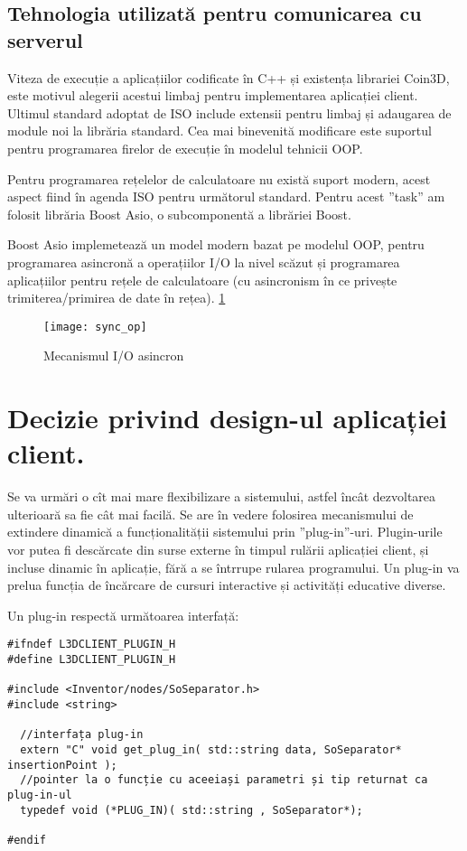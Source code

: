 \subsection{Tehnologia utilizată pentru comunicarea cu serverul}

\par Viteza de execuție a aplicațiilor codificate în C++ și existența librariei Coin3D, este motivul alegerii acestui limbaj pentru implementarea aplicației client. Ultimul standard adoptat de ISO include extensii pentru limbaj și adaugarea de module noi la librăria standard. Cea mai binevenită modificare este suportul pentru programarea firelor de execuție în modelul tehnicii OOP. 
\par Pentru programarea rețelelor de calculatoare nu există suport modern, acest aspect fiind în agenda ISO pentru următorul standard. Pentru acest ”task” am folosit librăria Boost Asio, o subcomponentă a librăriei Boost. 
\par Boost Asio implemetează un model modern bazat pe modelul OOP, pentru programarea asincronă a operațiilor I/O la nivel scăzut și programarea aplicațiilor pentru rețele de calculatoare (cu asincronism în ce privește trimiterea/primirea de date în rețea). \ref{fig:asio}

\begin{figure}[h]
    \centering
    \texttt{[image: sync\_op]}
    \caption{Mecanismul I/O asincron}
    \label{fig:asio}
\end{figure}

\section{Decizie privind design-ul aplicației client.}
\par Se va urmări o cît mai mare flexibilizare a sistemului, astfel încât dezvoltarea ulterioară sa fie cât mai facilă. Se are în vedere folosirea mecanismului de extindere dinamică a funcționalității sistemului prin ”plug-in”-uri. 	Plugin-urile vor putea fi descărcate din surse externe în timpul rulării aplicației client, și incluse dinamic în aplicație, fără a se întrrupe rularea programului. Un plug-in va prelua funcția de încărcare de cursuri interactive și activități educative diverse. 

	 Un plug-in respectă următoarea interfață:
\begin{verbatim}
#ifndef L3DCLIENT_PLUGIN_H
#define L3DCLIENT_PLUGIN_H

#include <Inventor/nodes/SoSeparator.h>
#include <string>
 
  //interfața plug-in
  extern "C" void get_plug_in( std::string data, SoSeparator* insertionPoint );
  //pointer la o funcție cu aceeiași parametri și tip returnat ca plug-in-ul
  typedef void (*PLUG_IN)( std::string , SoSeparator*);

#endif
\end{verbatim}	
	
